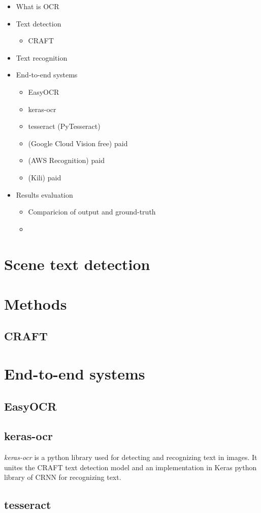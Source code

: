 
\begin{itemize}
    \item What is OCR
    \item Text detection
    \begin{itemize}
        \item CRAFT
    \end{itemize}
    \item Text recognition
    \item End-to-end systems
    \begin{itemize}
        \item EasyOCR
        \item keras-ocr
        \item tesseract (PyTesseract)
        \item (Google Cloud Vision free) paid
        \item (AWS Recognition) paid 
        \item (Kili) paid
    \end{itemize}
    \item Results evaluation
    \begin{itemize}
        \item Comparicion of output and ground-truth
        \item 
    \end{itemize}
\end{itemize}


\section{Scene text detection}

\section*{Methods}
\subsection{CRAFT}

\section{End-to-end systems}
\subsection{EasyOCR}
\subsection{keras-ocr}

\emph{keras-ocr} is a python library used for detecting and recognizing text in images. It unites the CRAFT text detection model and an implementation in Keras python library of CRNN for recognizing text. 

\subsection{tesseract}





